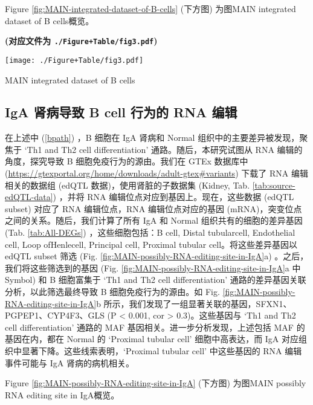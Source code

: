 \documentclass[
]{article}
\begin{document}
Figure \ref{fig:MAIN-integrated-dataset-of-B-cells} (下方图) 为图MAIN integrated dataset of B cells概览。

\textbf{(对应文件为 \texttt{./Figure+Table/fig3.pdf})}

\def\@captype{figure}
\begin{center}
\texttt{[image: ./Figure+Table/fig3.pdf]}
\caption{MAIN integrated dataset of B cells}\label{fig:MAIN-integrated-dataset-of-B-cells}
\end{center}

\hypertarget{iga-ux80beux75c5ux5bfcux81f4-b-cell-ux884cux4e3aux7684-rna-ux7f16ux8f91}{%
\subsection{IgA 肾病导致 B cell 行为的 RNA 编辑}\label{iga-ux80beux75c5ux5bfcux81f4-b-cell-ux884cux4e3aux7684-rna-ux7f16ux8f91}}

在上述中 (\ref{bpath}) ，B 细胞在 IgA 肾病和 Normal 组织中的主要差异被发现，聚焦于 `Th1 and Th2 cell differentiation' 通路。随后，本研究试图从 RNA 编辑的角度，探究导致 B 细胞免疫行为的源由。我们在 GTEx 数据库中 (\url{https://gtexportal.org/home/downloads/adult-gtex\#variants}) 下载了 RNA 编辑相关的数据组 (edQTL 数据)，使用肾脏的子数据集 (Kidney, Tab. \ref{tab:source-edQTL-data}) ，并将 RNA 编辑位点对应到基因上。现在，这些数据 (edQTL subset) 对应了 RNA 编辑位点，RNA 编辑位点对应的基因 (mRNA)，突变位点之间的关系。随后，我们计算了所有 IgA 和 Normal 组织共有的细胞的差异基因 (Tab. \ref{tab:All-DEGs}) ，这些细胞包括：B cell, Distal tubularcell, Endothelial cell, Loop ofHenlecell, Principal cell, Proximal tubular cell。将这些差异基因以 edQTL subset 筛选 (Fig. \ref{fig:MAIN-possibly-RNA-editing-site-in-IgA}a) 。之后，我们将这些筛选到的基因 (Fig. \ref{fig:MAIN-possibly-RNA-editing-site-in-IgA}a 中 Symbol) 和 B 细胞富集于 `Th1 and Th2 cell differentiation' 通路的差异基因关联分析，以此筛选最终导致 B 细胞免疫行为的源由。如 Fig. \ref{fig:MAIN-possibly-RNA-editing-site-in-IgA}b 所示，我们发现了一组显著关联的基因，SFXN1、PGPEP1、CYP4F3、GLS (P \textless{} 0.001, cor \textgreater{} 0.3)。这些基因与 `Th1 and Th2 cell differentiation' 通路的 MAF 基因相关。进一步分析发现，上述包括 MAF 的基因在内，都在 Normal 的 `Proximal tubular cell' 细胞中高表达，而 IgA 对应组织中显著下降。这些线索表明，`Proximal tubular cell' 中这些基因的 RNA 编辑事件可能与 IgA 肾病的病机相关。

Figure \ref{fig:MAIN-possibly-RNA-editing-site-in-IgA} (下方图) 为图MAIN possibly RNA editing site in IgA概览。
\end{document}
